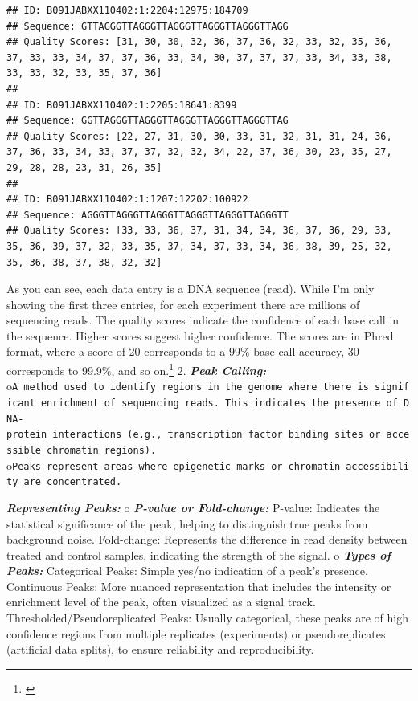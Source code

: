 \documentclass[
]{book}
\begin{document}
\begin{verbatim}
## ID: B091JABXX110402:1:2204:12975:184709
## Sequence: GTTAGGGTTAGGGTTAGGGTTAGGGTTAGGGTTAGG
## Quality Scores: [31, 30, 30, 32, 36, 37, 36, 32, 33, 32, 35, 36, 37, 33, 33, 34, 37, 37, 36, 33, 34, 30, 37, 37, 37, 33, 34, 33, 38, 33, 33, 32, 33, 35, 37, 36]
## 
## ID: B091JABXX110402:1:2205:18641:8399
## Sequence: GGTTAGGGTTAGGGTTAGGGTTAGGGTTAGGGTTAG
## Quality Scores: [22, 27, 31, 30, 30, 33, 31, 32, 31, 31, 24, 36, 37, 36, 33, 34, 33, 37, 37, 32, 32, 34, 22, 37, 36, 30, 23, 35, 27, 29, 28, 28, 23, 31, 26, 35]
## 
## ID: B091JABXX110402:1:1207:12202:100922
## Sequence: AGGGTTAGGGTTAGGGTTAGGGTTAGGGTTAGGGTT
## Quality Scores: [33, 33, 36, 37, 31, 34, 34, 36, 37, 36, 29, 33, 35, 36, 39, 37, 32, 33, 35, 37, 34, 37, 33, 34, 36, 38, 39, 25, 32, 35, 36, 38, 37, 38, 32, 32]
\end{verbatim}

As you can see, each data entry is a DNA sequence (read). While I'm only showing the first three entries, for each experiment there are millions of sequencing reads. The quality scores indicate the confidence of each base call in the sequence. Higher scores suggest higher confidence. The scores are in Phred format, where a score of 20 corresponds to a 99\% base call accuracy, 30 corresponds to 99.9\%, and so on.\footnote{\citet{green}}
2. \textbf{\emph{Peak Calling:}}
o\texttt{A\ method\ used\ to\ identify\ regions\ in\ the\ genome\ where\ there\ is\ significant\ enrichment\ of\ sequencing\ reads.\ This\ indicates\ the\ presence\ of\ DNA-protein\ interactions\ (e.g.,\ transcription\ factor\ binding\ sites\ or\ accessible\ chromatin\ regions).}
o\texttt{Peaks\ represent\ areas\ where\ epigenetic\ marks\ or\ chromatin\ accessibility\ are\ concentrated.}

\textbf{\emph{Representing Peaks:}}
o \textbf{\emph{P-value or Fold-change:}}
P-value: Indicates the statistical significance of the peak, helping to distinguish true peaks from background noise.
Fold-change: Represents the difference in read density between treated and control samples, indicating the strength of the signal.
o \textbf{\emph{Types of Peaks:}}
Categorical Peaks: Simple yes/no indication of a peak's presence.
Continuous Peaks: More nuanced representation that includes the intensity or enrichment level of the peak, often visualized as a signal track.
Thresholded/Pseudoreplicated Peaks: Usually categorical, these peaks are of high confidence regions from multiple replicates (experiments) or pseudoreplicates (artificial data splits), to ensure reliability and reproducibility.
\end{document}
